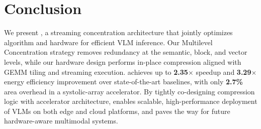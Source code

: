\section{Conclusion}
We present \proj{}, a streaming concentration architecture that jointly optimizes algorithm and hardware for efficient VLM inference.  
Our Multilevel Concentration strategy removes redundancy at the semantic, block, and vector levels, while our hardware design performs in-place compression aligned with GEMM tiling and streaming execution.
\proj{} achieves up to \textbf{2.35$\times$} speedup and {\textbf{3.29$\times$}} energy efficiency improvement over state-of-the-art baselines, with only {\textbf{2.7\%}} area overhead in a systolic-array accelerator.
By tightly co-designing compression logic with accelerator architecture, \proj{} enables scalable, high-performance deployment of VLMs on both edge and cloud platforms, and paves the way for future hardware-aware multimodal systems.


